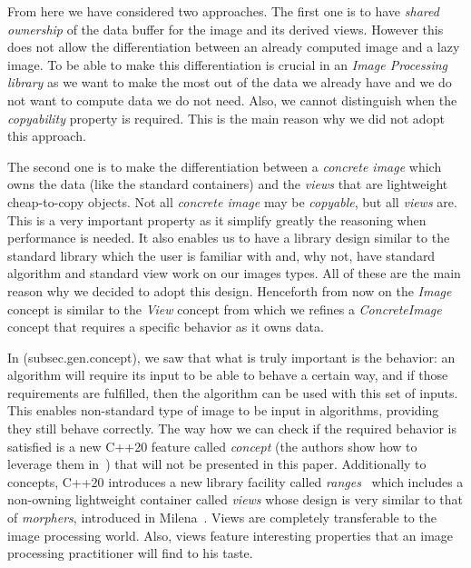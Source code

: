 From here we have considered two approaches. The first one is to have \emph{shared ownership} of the data buffer for the
image and its derived views. However this does not allow the differentiation between an already computed image and a
lazy image. To be able to make this differentiation is crucial in an \emph{Image Processing library} as we want to make
the most out of the data we already have and we do not want to compute data we do not need. Also, we cannot distinguish
when the \emph{copyability} property is required. This is the main reason why we did not adopt this approach.

The second one is to make the differentiation between a \emph{concrete image} which owns the data (like the standard
containers) and the \emph{views} that are lightweight cheap-to-copy objects. Not all \emph{concrete image} may be
\emph{copyable}, but all \emph{views} are. This is a very important property as it simplify greatly the reasoning when
performance is needed. It also enables us to have a library design similar to the standard library which the user is
familiar with and, why not, have standard algorithm and standard view work on our images types. All of these are the
main reason why we decided to adopt this design. Henceforth from now on the \emph{Image} concept is similar to the
\emph{View} concept from which we refines a \emph{ConcreteImage} concept that requires a specific behavior as it owns
data.


In (subsec.gen.concept), we saw that what is truly important is the behavior: an algorithm will require its input to be
able to behave a certain way, and if those requirements are fulfilled, then the algorithm can be used with this set of
inputs. This enables non-standard type of image to be input in algorithms, providing they still behave correctly. The
way how we can check if the required behavior is satisfied is a new C++20 feature called \emph{concept} (the authors
show how to leverage them in~\cite{roynard.2019.rrpr}) that will not be presented in this paper. Additionally to
concepts, C++20 introduces a new library facility called
\emph{ranges}~\cite{niebler.2018.deepranges,niebler.2018.mergingranges} which includes a non-owning lightweight
container called \emph{views} whose design is very similar to that of \emph{morphers}, introduced in
Milena~\cite{levillain.2009.ismm,geraud.2012.hdr}. Views are completely transferable to the image processing world.
Also, views feature interesting properties that an image processing practitioner will find to his taste.

